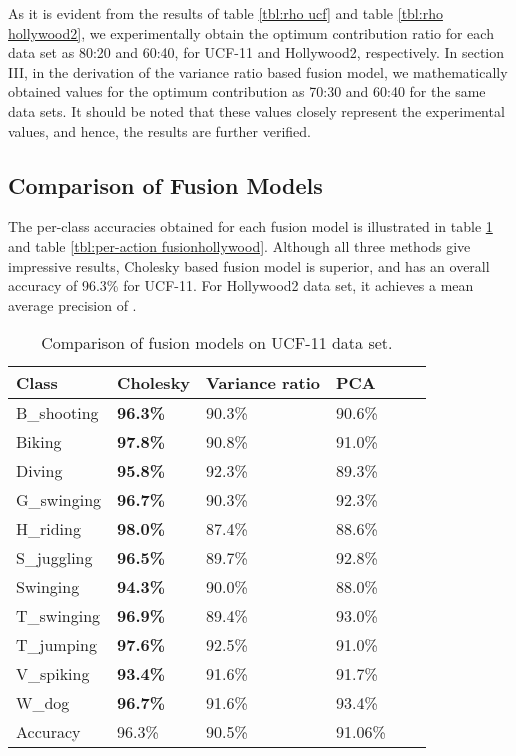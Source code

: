 As it is evident from the results of table \ref{tbl:rho ucf} and table \ref{tbl:rho hollywood2}, we experimentally obtain the
optimum contribution ratio for each data set as 80:20 and 60:40, for UCF-11 and Hollywood2, respectively. In section III, in the derivation of the variance ratio based fusion model,
we mathematically obtained values for the optimum contribution as 70:30 and 60:40 for the same data sets. It should be noted that these values closely
represent the experimental values, and hence, the results are further verified.

\subsection{Comparison of Fusion Models}
The per-class accuracies obtained for each fusion model is illustrated in table \ref{tbl:per-action fusionucf} and
table \ref{tbl:per-action fusionhollywood}. Although all three methods give impressive results, Cholesky based fusion
model is superior, and has an overall accuracy of 96.3\% for UCF-11. For Hollywood2 data set, it achieves a mean average precision
of .


\begin{table}[]
\centering
\caption{Comparison of fusion models on UCF-11 data set.}\label{tbl:per-action fusionucf}
\begin{tabular}{|l||l|l|l|l|l|}
\hline
Class            & Cholesky & Variance ratio & PCA   \\ \hline  \hline
B\_shooting       & \textbf{96.3\%}    &  90.3\%   &  90.6\%  \\
Biking           & \textbf{97.8\%}    &  90.8\%   &  91.0\%    \\
Diving           & \textbf{95.8\%}    &  92.3\%   &  89.3\%   \\
G\_swinging       & \textbf{96.7\%}    &  90.3\%   &  92.3\%   \\
H\_riding         & \textbf{98.0\%}    &  87.4\%   &  88.6\%    \\
S\_juggling       & \textbf{96.5\%}    &  89.7\%   &  92.8\%    \\
Swinging         & \textbf{94.3\%}    &  90.0\%   &  88.0\%    \\
T\_swinging       & \textbf{96.9\%}    &  89.4\%   &  93.0\%   \\
T\_jumping        & \textbf{97.6\%}    &  92.5\%   &  91.0\%    \\
V\_spiking        &\textbf{93.4\%}    &  91.6\%   &  91.7\%   \\
W\_dog            & \textbf{96.7\%}    &  91.6\%   &  93.4\%   \\ \hline \hline
Accuracy &  96.3\%   &  90.5\%   &   91.06\%   \\ \hline
\end{tabular}
\end{table}

